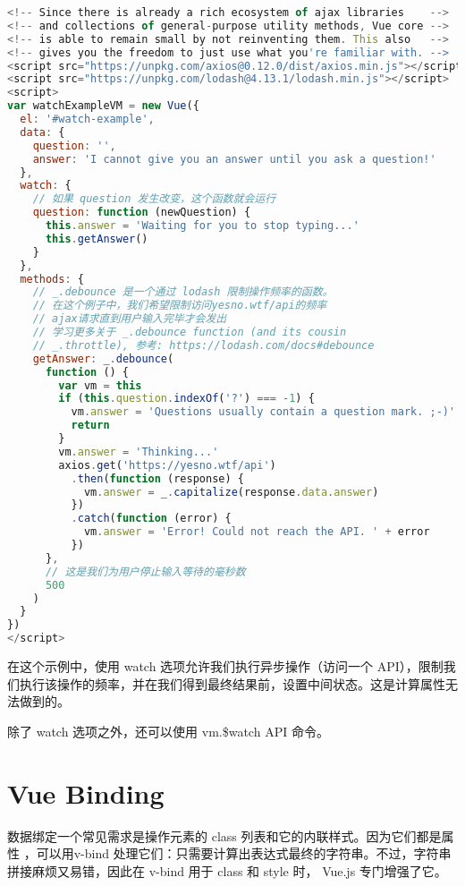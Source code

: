 \begin{lstlisting}[language=JavaScript]
<!-- Since there is already a rich ecosystem of ajax libraries    -->
<!-- and collections of general-purpose utility methods, Vue core -->
<!-- is able to remain small by not reinventing them. This also   -->
<!-- gives you the freedom to just use what you're familiar with. -->
<script src="https://unpkg.com/axios@0.12.0/dist/axios.min.js"></script>
<script src="https://unpkg.com/lodash@4.13.1/lodash.min.js"></script>
<script>
var watchExampleVM = new Vue({
  el: '#watch-example',
  data: {
    question: '',
    answer: 'I cannot give you an answer until you ask a question!'
  },
  watch: {
    // 如果 question 发生改变，这个函数就会运行
    question: function (newQuestion) {
      this.answer = 'Waiting for you to stop typing...'
      this.getAnswer()
    }
  },
  methods: {
    // _.debounce 是一个通过 lodash 限制操作频率的函数。
    // 在这个例子中，我们希望限制访问yesno.wtf/api的频率
    // ajax请求直到用户输入完毕才会发出
    // 学习更多关于 _.debounce function (and its cousin
    // _.throttle), 参考: https://lodash.com/docs#debounce
    getAnswer: _.debounce(
      function () {
        var vm = this
        if (this.question.indexOf('?') === -1) {
          vm.answer = 'Questions usually contain a question mark. ;-)'
          return
        }
        vm.answer = 'Thinking...'
        axios.get('https://yesno.wtf/api')
          .then(function (response) {
            vm.answer = _.capitalize(response.data.answer)
          })
          .catch(function (error) {
            vm.answer = 'Error! Could not reach the API. ' + error
          })
      },
      // 这是我们为用户停止输入等待的毫秒数
      500
    )
  }
})
</script>
\end{lstlisting}

在这个示例中，使用 watch 选项允许我们执行异步操作（访问一个 API），限制我们执行该操作的频率，并在我们得到最终结果前，设置中间状态。这是计算属性无法做到的。

除了 watch 选项之外，还可以使用 vm.\$watch API 命令。


\chapter{Vue Binding}


数据绑定一个常见需求是操作元素的 class 列表和它的内联样式。因为它们都是属性 ，可以用v-bind 处理它们：只需要计算出表达式最终的字符串。不过，字符串拼接麻烦又易错，因此在 v-bind 用于 class 和 style 时， Vue.js 专门增强了它。



